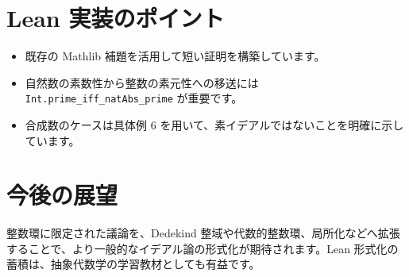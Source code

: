 \documentclass[12pt]{ltjsarticle}
\theoremstyle{definition}
\theoremstyle{plain}
\theoremstyle{remark}
\begin{document}
\section{Lean 実装のポイント}
\begin{itemize}
  \item 既存の Mathlib 補題を活用して短い証明を構築しています。
  \item 自然数の素数性から整数の素元性への移送には \texttt{Int.prime\_iff\_natAbs\_prime} が重要です。
  \item 合成数のケースは具体例 $6$ を用いて、素イデアルではないことを明確に示しています。
\end{itemize}

\section{今後の展望}
整数環に限定された議論を、Dedekind 整域や代数的整数環、局所化などへ拡張することで、より一般的なイデアル論の形式化が期待されます。Lean 形式化の蓄積は、抽象代数学の学習教材としても有益です。
\end{document}
